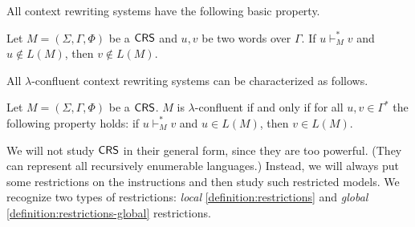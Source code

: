 All context rewriting systems have the following basic property.

\begin{lemma}\label{lemma:error-preserving}
Let $M=(\Sigma, \Gamma, \Phi)$ be a $\textup{\sf CRS\/}$ and $u, v$ be two words over $\Gamma$. 
If $u \vdash_M^* v$ and $u \not\in L(M)$, then $v \not\in L(M)$.
\end{lemma}

All $\lambda$-confluent context rewriting systems can be characterized as follows.

\begin{lemma}\label{lemma:correctness-preserving}
Let $M=(\Sigma, \Gamma, \Phi)$ be a $\textup{\sf CRS\/}$. $M$ is $\lambda$-confluent if and only if for all $u, v \in \Gamma^*$ the following property holds: if $u \vdash_M^* v$ and $u \in L(M)$, then $v \in L(M)$.
\end{lemma}

We will not study $\textup{\sf CRS\/}$ in their general form, since they are too powerful. (They can represent all recursively enumerable languages.) Instead, we will always put some restrictions on the instructions and then study such restricted models. We recognize two types of restrictions: \emph{local} \ref{definition:restrictions} and \emph{global} \ref {definition:restrictions-global} restrictions.

